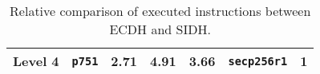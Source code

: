 \begin{table}[H]
\begin{tabular}{|K{1.8cm}|K{1.8cm}|K{1.8cm}|K{2cm}|K{1.8cm}|K{1.8cm}|K{1.8cm}|}
\hline
{}Level 4                                                                                                                                                & {}\texttt{p751}                                                                   & 2.71                 & 4.91                                                                                                        & 3.66           & {}\texttt{secp256r1}                                                              & {}1  \\
\hline
\end{tabular}
\caption[Comparing executed instructions between \gls{ECDH} and \gls{SIDH}]{Relative comparison of executed instructions between \gls{ECDH} and \gls{SIDH}.}
\label{tab:conclusion_ecdh_sidh}
\end{table}

